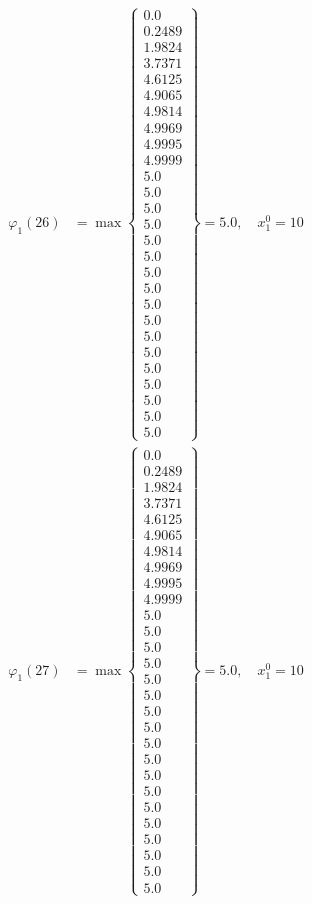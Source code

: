 \documentclass{article}
\begin{document}
\begin{align*}
  
  
  
\varphi_{1}(26) &= \max \left\{ \begin{array}{c}
0.0 \\
 0.2489 \\
 1.9824 \\
 3.7371 \\
 4.6125 \\
 4.9065 \\
 4.9814 \\
 4.9969 \\
 4.9995 \\
 4.9999 \\
 5.0 \\
 5.0 \\
 5.0 \\
 5.0 \\
 5.0 \\
 5.0 \\
 5.0 \\
 5.0 \\
 5.0 \\
 5.0 \\
 5.0 \\
 5.0 \\
 5.0 \\
 5.0 \\
 5.0 \\
 5.0 \\
 5.0
\end{array} \right\}=5.0,\quad x_{1}^0=10\\
  
  
  
  
\varphi_{1}(27) &= \max \left\{ \begin{array}{c}
0.0 \\
 0.2489 \\
 1.9824 \\
 3.7371 \\
 4.6125 \\
 4.9065 \\
 4.9814 \\
 4.9969 \\
 4.9995 \\
 4.9999 \\
 5.0 \\
 5.0 \\
 5.0 \\
 5.0 \\
 5.0 \\
 5.0 \\
 5.0 \\
 5.0 \\
 5.0 \\
 5.0 \\
 5.0 \\
 5.0 \\
 5.0 \\
 5.0 \\
 5.0 \\
 5.0 \\
 5.0 \\
 5.0
\end{array} \right\}=5.0,\quad x_{1}^0=10\\
  

\end{align*}
\end{document}
